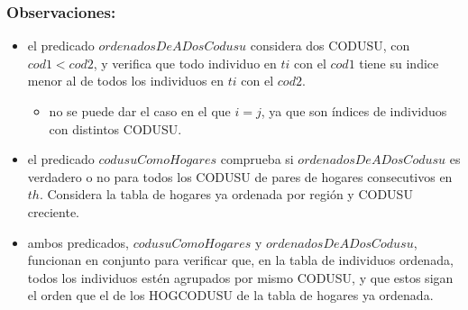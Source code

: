     \subsubsection{Observaciones:}
        \begin{itemize}
            \item el predicado $ordenadosDeADosCodusu$ considera dos CODUSU, con $cod1 < cod2$, y verifica que 
            todo individuo en $ti$ con el $cod1$ tiene su indice menor al de todos los individuos en $ti$ con el $cod2$.
                \begin{itemize}
                    \item no se puede dar el caso en el que $i = j$, ya que son \'indices de individuos con distintos CODUSU.
                \end{itemize}
            \item el predicado $codusuComoHogares$ comprueba si $ordenadosDeADosCodusu$ es verdadero o no para todos los 
            CODUSU de pares de hogares consecutivos en $th$. Considera la tabla de hogares ya ordenada por regi\'on y CODUSU creciente.
            \item ambos predicados, $codusuComoHogares$ y $ordenadosDeADosCodusu$, funcionan en conjunto para verificar que, 
            en la tabla de individuos ordenada, todos los individuos est\'en agrupados por mismo CODUSU, 
            y que estos sigan el orden que el de los HOGCODUSU de la tabla de hogares ya ordenada.
        \end{itemize}
